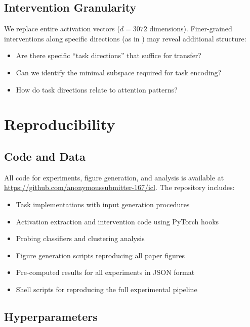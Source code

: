 \documentclass{article}
\begin{document}
\subsection{Intervention Granularity}

We replace entire activation vectors ($d=3072$ dimensions). Finer-grained interventions along specific directions (as in \citealp{todd2023function}) may reveal additional structure:
\begin{itemize}
    \item Are there specific ``task directions'' that suffice for transfer?
    \item Can we identify the minimal subspace required for task encoding?
    \item How do task directions relate to attention patterns?
\end{itemize}

\section{Reproducibility}
\label{app:reproducibility}

\subsection{Code and Data}

All code for experiments, figure generation, and analysis is available at \url{https://github.com/anonymoussubmitter-167/icl}. The repository includes:
\begin{itemize}
    \item Task implementations with input generation procedures
    \item Activation extraction and intervention code using PyTorch hooks
    \item Probing classifiers and clustering analysis
    \item Figure generation scripts reproducing all paper figures
    \item Pre-computed results for all experiments in JSON format
    \item Shell scripts for reproducing the full experimental pipeline
\end{itemize}

\subsection{Hyperparameters}
\end{document}
